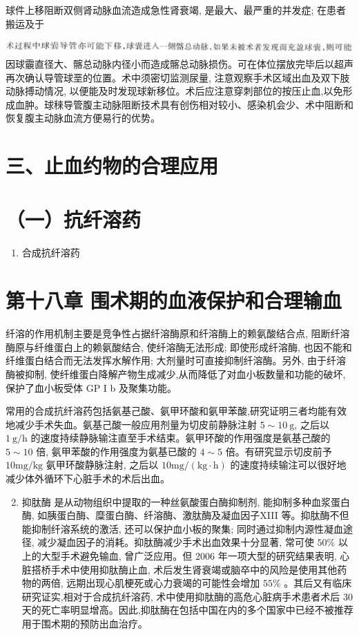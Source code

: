 \documentclass[10pt]{article}
\begin{document}
球件上移阻断双侧肾动脉血流造成急性肾衰竭, 是最大、最严重的并发症; 在患者搬运及于

\includegraphics[max width=\textwidth, center]{2024_07_09_002a177993bd97d1d6d7g-190(1)}\\
因球䨳直径大、髂总动脉内径小而造成髂总动脉损伤。可在体位摆放完毕后以超声再次确认导管球垩的位置。术中须密切监测尿量, 注意观察手术区域出血及双下肢动脉搏动情况, 以便能及时发现球新移位。术后应注意穿刺部位的按压止血,以免形成血肿。球䅘导管腹主动脉阻断技术具有创伤相对较小、感染机会少、术中阻断和恢复腹主动脉血流方便易行的优势。

\section*{三、止血约物的合理应用}
\section*{（一）抗纤溶药}
\begin{enumerate}
  \item 合成抗纤溶药
\end{enumerate}

\section*{第十八章 围术期的血液保护和合理输血}
纤溶的作用机制主要是竞争性占据纤溶酶原和纤溶酶上的赖氨酸结合点, 阻断纤溶酶原与纤维蛋白上的赖氨酸结合, 使纤溶酶无法形成; 即使形成纤溶酶, 也因不能和纤维蛋白结合而无法发挥水解作用; 大剂量时可直接抑制纤溶酶。另外, 由于纤溶酶被抑制, 使纤维蛋白降解产物生成减少,从而降低了对血小板数量和功能的破坏,保护了血小板受体 GP I b 及聚集功能。

常用的合成抗纤溶药包括氨基己酸、氨甲环酸和氨甲苯酸,研究证明三者均能有效地减少手术失血。氨基己酸一般应用剂量为切皮前静脉注射 $5 \sim 10 \mathrm{~g}$, 之后以 $1 \mathrm{~g} / \mathrm{h}$ 的速度持续静脉输注直至手术结束。氨甲环酸的作用强度是氨基己酸的 $5 \sim 10$ 倍, 氨甲苯酸的作用强度为氨基已酸的 $4 \sim 5$ 倍。有研究显示切皮前予 $10 \mathrm{mg} / \mathrm{kg}$ 氨甲环酸静脉注射, 之后以 $10 \mathrm{mg} /(\mathrm{kg} \cdot \mathrm{h})$ 的速度持续输注可以很好地减少体外循环下心脏手术的术后出血。

\begin{enumerate}
  \setcounter{enumi}{1}
  \item 抑肽酶 是从动物组织中提取的一种丝氨酸蛋白酶抑制剂, 能抑制多种血浆蛋白酶, 如胰蛋白酶、糜蛋白酶、纤溶酶、激肽酶及凝血因子XIII 等。抑肽酶不但能抑制纤溶系统的激活, 还可以保护血小板的聚集; 同时通过抑制内源性凝血途径, 减少凝血因子的消耗。抑肽酶减少手术出血效果十分显著, 常可使 $50 \%$ 以上的大型手术避免输血, 曾广泛应用。但 2006 年一项大型的研究结果表明, 心脏搭桥手术中使用抑肽酶止血, 术后发生肾衰竭或脑卒中的风险是使用其他药物的两倍, 远期出现心肌梗死或心力衰竭的可能性会增加 $55 \%$ 。其后又有临床研究证实,相对于合成抗纤溶药, 术中使用抑肽酶的高危心脏病手术患者术后 30 天的死亡率明显增高。因此,抑肽酶在包括中国在内的多个国家中已经不被推荐用于围术期的预防出血治疗。
\end{enumerate}
\end{document}

